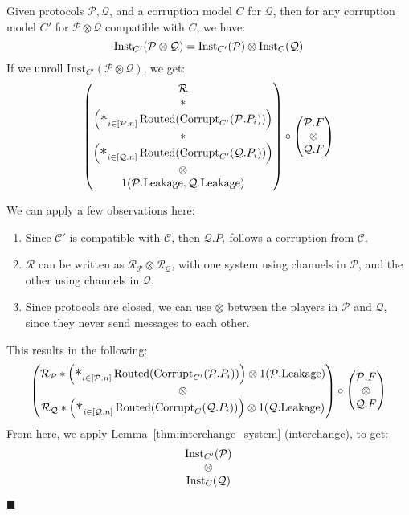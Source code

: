 \begin{theorem}
  Given protocols $\mathcal{P}, \mathcal{Q}$, and a corruption model $C$
  for $\mathcal{Q}$, then for any corruption model $C'$ for $\mathcal{P} \otimes \mathcal{Q}$ compatible with $C$, we have:
  \[
    \text{Inst}_{C'}(\mathcal{P} \otimes \mathcal{Q}) = \text{Inst}_{C'}(\mathcal{P}) \otimes \text{Inst}_C(\mathcal{Q})
  \]
 If we unroll $\text{Inst}_{C'}(\mathcal{P} \otimes \mathcal{Q})$, we get:
$$
\begin{pmatrix}
\mathcal{R}\cr
*\cr
\left(\bigast_{i \in [\mathcal{P}.n]} \tx{Routed}(\tx{Corrupt}_{C'}(\mathcal{P}.P_i))\right)\cr
*\cr
\left(\bigast_{i \in [\mathcal{Q}.n]} \tx{Routed}(\tx{Corrupt}_{C'}(\mathcal{Q}.P_i))\right)\cr
\otimes\cr
1(\mathcal{P}.\tx{Leakage}, \mathcal{Q}.\tx{Leakage})
\end{pmatrix}
\circ
\begin{pmatrix}
\mathcal{P}.F\cr
\otimes\cr
\mathcal{Q}.F\cr
\end{pmatrix}
$$

We can apply a few observations here:
\begin{enumerate}
  \item Since $\mathcal{C}'$ is compatible with $\mathcal{C}$, then $\mathcal{Q}.P_i$ follows a corruption from $\mathcal{C}$.
  \item $\mathcal{R}$ can be written as $\mathcal{R}_\mathcal{P} \otimes \mathcal{R}_\mathcal{Q}$,
  with one system using channels in $\mathcal{P}$, and the other using channels in $\mathcal{Q}$.
  \item Since protocols are closed, we can use $\otimes$ between the players in $\mathcal{P}$ and $\mathcal{Q}$,
  since they never send messages to each other.
\end{enumerate}
This results in the following:
$$
\begin{pmatrix}
  \mathcal{R}_{\mathcal{P}} * \left(\bigast_{i \in [\mathcal{P}.n]} \tx{Routed}(\tx{Corrupt}_{C'}(\mathcal{P}.P_i))\right) \otimes 1(\mathcal{P}.\tx{Leakage})\cr
\otimes\cr
  \mathcal{R}_{\mathcal{Q}} * \left(\bigast_{i \in [\mathcal{Q}.n]} \tx{Routed}(\tx{Corrupt}_{C}(\mathcal{Q}.P_i))\right) \otimes 1(\mathcal{Q}.\tx{Leakage})
\end{pmatrix}
\circ
\begin{pmatrix}
\mathcal{P}.F\cr
\otimes\cr
\mathcal{Q}.F\cr
\end{pmatrix}
$$
From here, we apply Lemma~\ref{thm:interchange_system} (interchange), to get:
$$
\begin{matrix}
\text{Inst}_{C'}(\mathcal{P})\cr
\otimes\cr
\text{Inst}_{C}(\mathcal{Q})\cr
\end{matrix}
$$

$\blacksquare$

\end{theorem}


